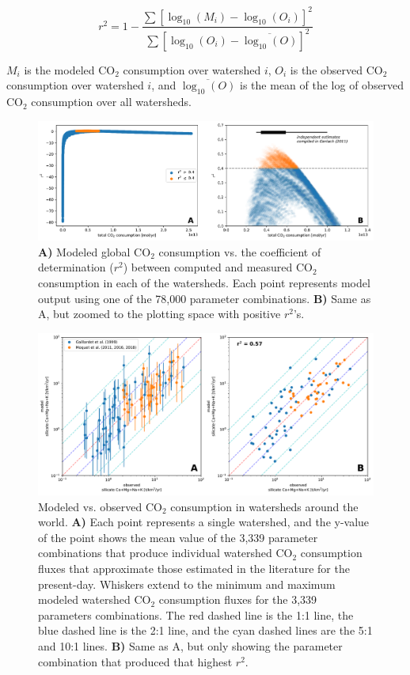 \documentclass[11pt,letterpaper]{article}
\newcommand{\COtwo}{CO$_{2}$\xspace}
\begin{document}
\begin{equation}
    r^{2} = 1 - \frac{\sum\left[ \log_{10}(M_{i}) - \log_{10}(O_{i}) \right]^{2}}{\sum\left[ \log_{10}(O_{i}) - \overline{\log_{10}(O)} \right]^{2}}
    \label{eq:10}
\end{equation}

\noindent
$M_{i}$ is the modeled \COtwo consumption over watershed $i$, $O_{i}$ is the observed \COtwo consumption over watershed $i$, and $\overline{\log_{10}(O)}$ is the mean of the log of observed \COtwo consumption over all watersheds.

\begin{figure}[h!]
    \centering
    \includegraphics[width=1\textwidth]{Manuscript/Figures/W_vs_r2.pdf}
    \caption{\textbf{A)} Modeled global \COtwo consumption vs. the coefficient of determination ($r^{2}$) between computed and measured \COtwo consumption in each of the watersheds. Each point represents model output using one of the 78,000 parameter combinations. \textbf{B)} Same as A, but zoomed to the plotting space with positive $r^{2}$'s.}
    \label{fig:W_vs_r2}
\end{figure}

\begin{figure}[h!]
    \centering
    \includegraphics[width=1\textwidth]{Manuscript/Figures/r2_cross_plot.pdf}
    \caption{Modeled vs. observed \COtwo consumption in watersheds around the world. \textbf{A)} Each point represents a single watershed, and the y-value of the point shows the mean value of the 3,339 parameter combinations that produce individual watershed \COtwo consumption fluxes that approximate those estimated in the literature for the present-day. Whiskers extend to the minimum and maximum modeled watershed \COtwo consumption fluxes for the 3,339 parameters combinations. The red dashed line is the 1:1 line, the blue dashed line is the 2:1 line, and the cyan dashed lines are the 5:1 and 10:1 lines. \textbf{B)} Same as A, but only showing the parameter combination that produced that highest $r^{2}$.}
    \label{fig:r2_cross_plot}
\end{figure}
\end{document}
